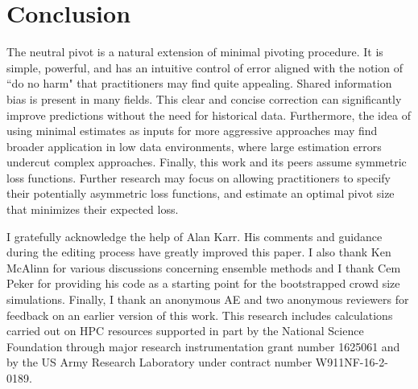 \section{Conclusion}

The neutral pivot is a natural extension of minimal pivoting procedure. It is simple, powerful, and has an intuitive control of error aligned with the notion of ``do no harm" that practitioners may find quite appealing. Shared information bias is present in many fields. This clear and concise correction can significantly improve predictions without the need for historical data. Furthermore, the idea of using minimal estimates as inputs for more aggressive approaches may find broader application in low data environments, where large estimation errors undercut complex approaches. Finally, this work and its peers assume symmetric loss functions. Further research may focus on allowing practitioners to specify their potentially asymmetric loss functions, and estimate an optimal pivot size that minimizes their expected loss.
\clearpage
\begin{acknowledgement}
    I gratefully acknowledge the help of Alan Karr. His comments and guidance during the editing process have greatly improved this paper. I also thank Ken McAlinn for various discussions concerning ensemble methods and I thank Cem Peker for providing his code as a starting point for the bootstrapped crowd size simulations. Finally, I thank an anonymous AE and two anonymous reviewers for feedback on an earlier version of this work. This research includes calculations carried out on HPC resources supported in part by the National Science Foundation through major research instrumentation grant number 1625061 and by the US Army Research Laboratory under contract number W911NF-16-2-0189.
\end{acknowledgement}


